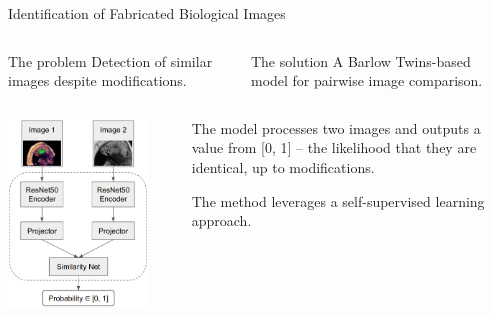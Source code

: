 \documentclass[]{beamer}
\begin{document}
\begin{frame}{Identification of Fabricated Biological Images}
\begin{columns}
    \begin{column}{0.42\textwidth}
        \begin{block}{The problem}
        Detection of similar images despite modifications.
        \end{block}
    \end{column}
    \begin{column}{0.58\textwidth}
        \begin{block}{The solution}
        A Barlow Twins\footnotemark{}-based 
        model for pairwise image comparison.
        \end{block}
    \end{column}
\end{columns}

\medskip

\begin{columns}
    \begin{column}{0.42\textwidth}
        \includegraphics[width=0.86\textwidth]{model.png}
    \end{column}
    \begin{column}{0.58\textwidth}
        The model processes two images and outputs a value from [0, 1] --
        the likelihood that they are identical, up to modifications.
        
        \bigskip
        The method leverages a self-supervised learning approach.
    \end{column}
\end{columns}
\end{frame}
\end{document}
